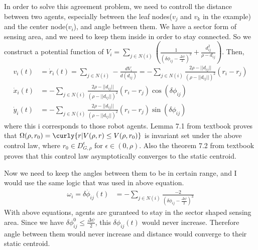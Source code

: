 \documentclass{article}
\begin{document}
\begin{problem}
    \vspace{12pt}
    In order to solve this agreement problem, we need to controll the distance between two agents, especially between the leaf nodes($v_j$ and $v_k$ in the example) and the center node($v_i$), and angle between them. We have a sector form of sensing area, and we need to keep them inside in order to stay connected. So we construct a potential function of $V_i = \sum_{j \in N(i) }(\frac{1}{(\delta \phi_{ij} - \frac{\Delta \psi}{2})^2} + \frac{d_{ij}^2}{\rho - d_{ij}})$. Then, 
    \begin{align*}
        v_i(t)&=\dot r_i(t) = \sum_{j \in N(i) }-\frac{dV_{i}}{d (d_{ij})}= -\sum_{j \in N(i) }\frac{2\rho  - ||d_{ij}||}{(\rho  - ||d_{ij} ||)^2} (r_{i} - r_{j} ) \\
        \dot x_i(t) &= -\sum_{j \in N(i) }\frac{2\rho  - ||d_{ij}||}{(\rho  - ||d_{ij} ||)^2} (r_{i} - r_{j} ) \cos(\delta \phi_{ij})\\
        \dot y_i(t) &= -\sum_{j \in N(i) }\frac{2\rho  - ||d_{ij}||}{(\rho  - ||d_{ij} ||)^2} (r_{i} - r_{j} ) \sin(\delta \phi_{ij})
    \end{align*}
    where this i corresponds to those robot agents. Lemma 7.1 from textbook proves that $\Omega (\rho, r_0) = \curly{r| V(\rho, r) \leq V(\rho, r_0)}$ is invariant set under the above control law, where $r_0 \in D_{G, \rho} ^\epsilon$ for $\epsilon \in (0, \rho)$. Also the theorem 7.2 from textbook proves that this control law asymptotically converges to the static centroid. 

    Now we need to keep the angles between them to be in certain range, and I would use the same logic that was used in above equation.
    \begin{align*}
        \omega_i = \dot {\delta \phi_{ij}}(t) &= - \sum_{j \in N(i) }\frac{-2}{( \delta \phi_{ij}-\frac{\Delta \psi}{2})^3} 
    \end{align*}
    With above equations, agents are guranteed to stay in the sector shaped sensing area. Since we have $\delta \phi_{ij}^0 \leq \frac{\Delta \psi}{2}$, this $\delta \phi_{ij}(t)$ would never increase. Therefore angle between them would never increase and distance would converge to their static centroid. 


\end{problem}
\end{document}
